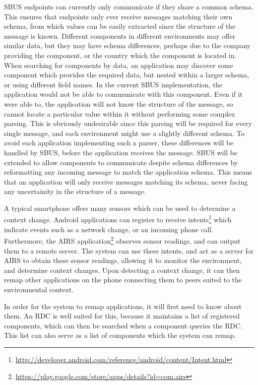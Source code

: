 \documentclass[12pt,twoside,notitlepage]{report}
\begin{document}
SBUS endpoints can currently only communicate if they share a common schema. 
This ensures that endpoints only ever receive messages matching their own schema, from which values can be easily extracted since the structure of the message is known. 
Different components in different environments may offer similar data, but they may have schema differences, perhaps due to the company providing the component, or the country which the component is located in. 
When searching for components by data, an application may discover some component which provides the required data, but nested within a larger schema, or using different field names. 
In the current SBUS implementation, the application would not be able to communicate with this component. 
Even if it were able to, the application will not know the structure of the message, so cannot locate a particular value within it without performing some complex parsing. 
This is obviously undesirable since this parsing will be required for every single message, and each environment might use a slightly different schema.
To avoid each application implementing such a parser, these differences will be handled by SBUS, before the application receives the message. 
SBUS will be extended to allow components to communicate despite schema differences by reformatting any incoming message to match the application schema.
This means that an application will only receive messages matching its schema, never facing any uncertainity in the structure of a message. 

A typical smartphone offers many sensors which can be used to determine a context change. 
Android applications can register to receive intents\footnote{\url{http://developer.android.com/reference/android/content/Intent.html}} which indicate events such as a network change, or an incoming phone call. 
Furthermore, the AIRS application\footnote{\url{https://play.google.com/store/apps/details?id=com.airs}} observes sensor readings, and can output them to a remote server.
The system can use these intents, and act as a server for AIRS to obtain these sensor readings, allowing it to monitor the environment, and determine context changes. 
Upon detecting a context change, it can then remap other applications on the phone connecting them to peers suited to the environmental context. 

In order for the system to remap applications, it will first need to know about them. 
An RDC is well suited for this, because it maintains a list of registered components, which can then be searched when a component queries the RDC. 
This list can also serve as a list of components which the system can remap.
\end{document}
